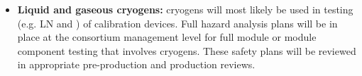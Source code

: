 \begin{itemize}
\item {\bf Liquid and gaseous cryogens:} cryogens will most likely be used in testing (e.g. LN and \lar) of calibration devices. Full hazard analysis plans will be in place at the consortium management level for full module or module component testing that involves cryogens. These safety plans will be reviewed in appropriate pre-production and production reviews.

\end{itemize}





